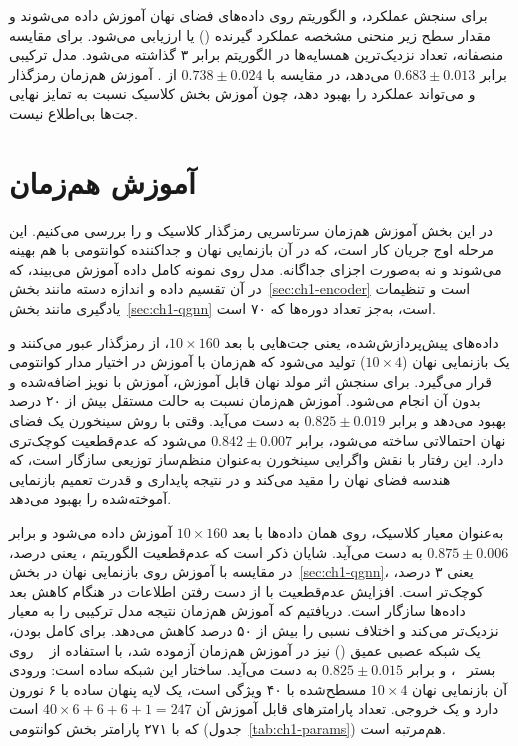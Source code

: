 برای سنجش عملکرد،  و الگوریتم  روی داده‌های فضای نهان آموزش داده می‌شوند و مقدار سطح زیر منحنی مشخصه عملکرد گیرنده () یا  ارزیابی می‌شود. برای مقایسه منصفانه، تعداد نزدیک‌ترین همسایه‌ها در الگوریتم  برابر ۳ گذاشته می‌شود. مدل ترکیبی  برابر $0.683\pm0.013$ می‌دهد، در مقایسه با $0.738\pm0.024$ از . آموزش هم‌زمان رمزگذار و  می‌تواند عملکرد را بهبود دهد، چون آموزش بخش کلاسیک نسبت به تمایز نهایی جت‌ها بی‌اطلاع نیست.

\section{آموزش هم‌زمان}
\label{sec:ch1-joint}
در این بخش آموزش هم‌زمان سرتاسریی رمزگذار کلاسیک و  را بررسی می‌کنیم. این مرحله اوج جریان کار است، که در آن بازنمایی نهان و جداکننده کوانتومی با هم بهینه می‌شوند و نه به‌صورت اجزای جداگانه. مدل روی نمونه کامل داده آموزش می‌بیند، که در آن تقسیم داده و اندازه دسته مانند بخش~\ref{sec:ch1-encoder} است و تنظیمات یادگیری مانند بخش~\ref{sec:ch1-qgnn} است، به‌جز تعداد دوره‌ها که ۷۰ است.

داده‌های پیش‌پردازش‌شده، یعنی جت‌هایی با بعد $10\times160$، از رمزگذار عبور می‌کنند و یک بازنمایی نهان ($10\times4$) تولید می‌شود که هم‌زمان با آموزش در اختیار مدار کوانتومی قرار می‌گیرد. برای سنجش اثر مولد نهان قابل آموزش، آموزش با نویز اضافه‌شده و بدون آن انجام می‌شود. آموزش هم‌زمان نسبت به حالت مستقل بیش از ۲۰ درصد بهبود می‌دهد و  برابر $0.825\pm0.019$ به دست می‌آید. وقتی با روش سینخورن یک فضای نهان احتمالاتی ساخته می‌شود،  برابر $0.842\pm0.007$ می‌شود که عدم‌قطعیت کوچک‌تری دارد. این رفتار با نقش واگرایی سینخورن به‌عنوان منظم‌ساز توزیعی سازگار است، که هندسه فضای نهان را مقید می‌کند و در نتیجه پایداری و قدرت تعمیم بازنمایی آموخته‌شده را بهبود می‌دهد.

به‌عنوان معیار کلاسیک،  روی همان داده‌ها با بعد $10\times160$ آموزش داده می‌شود و  برابر $0.875\pm0.006$ به دست می‌آید. شایان ذکر است که عدم‌قطعیت الگوریتم ، یعنی  درصد، در مقایسه با آموزش روی بازنمایی نهان در بخش~\ref{sec:ch1-qgnn}، یعنی ۳ درصد، کوچک‌تر است. افزایش عدم‌قطعیت با از دست رفتن اطلاعات در هنگام کاهش بعد داده‌ها سازگار است. دریافتیم که آموزش هم‌زمان نتیجه مدل ترکیبی را به معیار نزدیک‌تر می‌کند و اختلاف نسبی را بیش از ۵۰ درصد کاهش می‌دهد. برای کامل بودن، یک شبکه عصبی عمیق () نیز در آموزش هم‌زمان آزموده شد، با استفاده از ~\cite{Chollet:2015} روی بستر ~\cite{Abadi:2016}، و  برابر $0.825\pm0.015$ به دست می‌آید. ساختار این شبکه ساده است: ورودی آن بازنمایی نهان $10\times4$ مسطح‌شده با ۴۰ ویژگی است، یک لایه پنهان ساده با ۶ نورون دارد و یک خروجی. تعداد پارامترهای قابل آموزش آن $40\times6+6+6+1=247$ است که با ۲۷۱ پارامتر بخش کوانتومی (جدول~\ref{tab:ch1-params}) هم‌مرتبه است.


